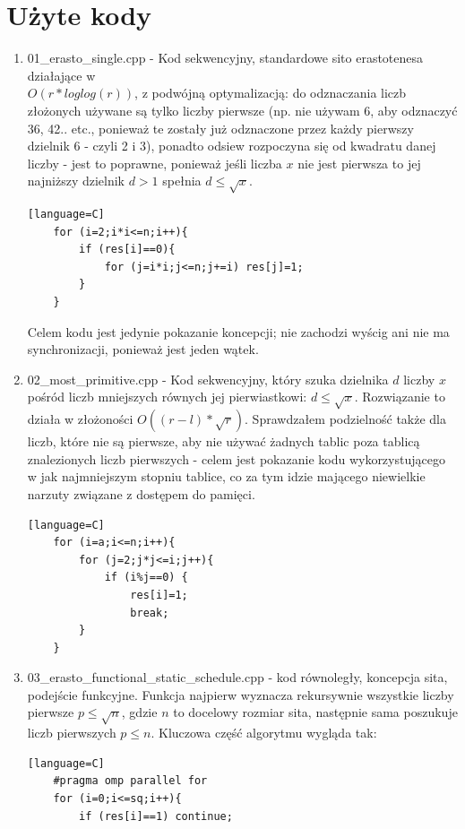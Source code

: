 \documentclass[12pt]{article}
\begin{document}
\section{Użyte kody}
\begin {enumerate}
	\item 01\_erasto\_single.cpp - Kod sekwencyjny, standardowe sito erastotenesa działające w\\ \(O(r*loglog(r))\), z podwójną optymalizacją: do odznaczania liczb złożonych używane są tylko liczby pierwsze (np. nie używam 6, aby odznaczyć 36, 42.. etc., ponieważ te zostały już odznaczone przez każdy pierwszy dzielnik 6 - czyli 2 i 3), ponadto odsiew rozpoczyna się od kwadratu danej liczby - jest to poprawne, ponieważ jeśli liczba \(x\) nie jest pierwsza to jej najniższy dzielnik \(d>1\) spełnia \(d\le \sqrt{x}\).
	\begin{lstlisting}[style=mystyle, caption= Sito Erastotenesa][language=C]
	for (i=2;i*i<=n;i++){
		if (res[i]==0){
			for (j=i*i;j<=n;j+=i) res[j]=1;
		}
	}
	\end{lstlisting}
	Celem kodu jest jedynie pokazanie koncepcji; nie zachodzi wyścig ani nie ma synchronizacji, ponieważ jest jeden wątek.
	\item 02\_most\_primitive.cpp - Kod sekwencyjny, który szuka dzielnika \(d\) liczby \(x\) pośród liczb mniejszych równych jej pierwiastkowi: \(d \le \sqrt{x}\). Rozwiązanie to działa w złożoności \(O((r-l)*\sqrt{r})\). Sprawdzałem podzielność także dla liczb, które nie są pierwsze, aby nie używać żadnych tablic poza tablicą znalezionych liczb pierwszych - celem jest pokazanie kodu wykorzystującego w jak najmniejszym stopniu tablice, co za tym idzie mającego niewielkie narzuty związane z dostępem do pamięci.
	\begin{lstlisting}[style=mystyle, caption= Rozwiązanie pierwiastkowe][language=C]	
	for (i=a;i<=n;i++){
		for (j=2;j*j<=i;j++){
			if (i%j==0) {
				res[i]=1;
				break;
		}
	}
	\end{lstlisting}
	\item 03\_erasto\_functional\_static\_schedule.cpp - kod równoległy, koncepcja sita, podejście funkcyjne. Funkcja najpierw wyznacza rekursywnie wszystkie liczby pierwsze \(p\le \sqrt{n}\), gdzie \(n\) to docelowy rozmiar sita, następnie sama poszukuje liczb pierwszych \(p\le n\). Kluczowa część algorytmu wygląda tak:
	\begin{lstlisting}[style=mystyle, caption= Sito funkcyjne ze static schedulingiem][language=C]
	#pragma omp parallel for
	for (i=0;i<=sq;i++){
		if (res[i]==1) continue;

\end{lstlisting}
\end{enumerate}
\end{document}
